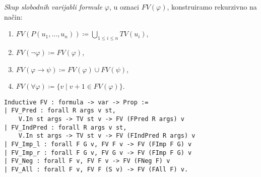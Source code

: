\begin{definition}
  \textit{Skup slobodnih varijabli formule} \(\varphi\), u oznaci \(\mathit{FV}(\varphi)\), konstruiramo rekurzivno na način:
  \begin{enumerate}
  \item \( \mathit{FV}(P(u_{1}, \ldots, u_{n})) \coloneq \bigcup_{1 \le i \le n} \mathit{TV}(u_{i}) \),
  \item \( \mathit{FV}(\neg\varphi) \coloneq \mathit{FV}(\varphi)\),
  \item \( \mathit{FV}(\varphi \rightarrow \psi) \coloneq \mathit{FV}(\varphi) \cup \mathit{FV}(\psi) \),
  \item \( \mathit{FV(\forall \varphi)} \coloneq \{ v \mid v + 1 \in \mathit{FV}(\varphi) \} \).
  \end{enumerate}
\begin{verbatim}
Inductive FV : formula -> var -> Prop :=
| FV_Pred : forall R args v st,
    V.In st args -> TV st v -> FV (FPred R args) v
| FV_IndPred : forall R args v st,
    V.In st args -> TV st v -> FV (FIndPred R args) v
| FV_Imp_l : forall F G v, FV F v -> FV (FImp F G) v
| FV_Imp_r : forall F G v, FV G v -> FV (FImp F G) v
| FV_Neg : forall F v, FV F v -> FV (FNeg F) v
| FV_All : forall F v, FV F (S v) -> FV (FAll F) v.
\end{verbatim}
\end{definition}

